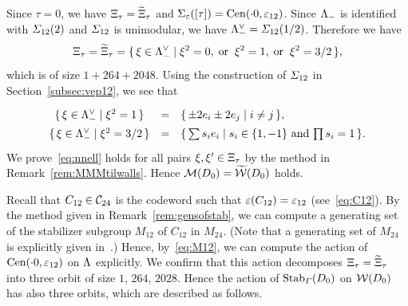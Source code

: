 \documentclass{amsart} %
\begin{document}
%
Since $\tau=0$,
we have $\Xi_{\tau}=\widetilde{\Xi}_{\tau}$ and $\Sigma_{\varepsilon}([\tau])=\mathrm{Cen}(\cdot 0, \varepsilon_{12})$.
Since $\Lambda_{-}$ is identified with $\varSigma_{12}(2)$ and $\varSigma_{12}$ is unimodular,
we have $\Lambda_{-}^{\vee}= \varSigma_{12}(1/2)$.
Therefore we have 
\[
\Xi_{\tau}=\widetilde{\Xi}_{\tau}=\{\,{\xi\in \Lambda_{-}^{\vee}}\mid {\xi^2=0, \;\textrm{or}\; \;  \xi^2=1,   \;\textrm{or}\; \; \xi^2=3/2} \,\},
\]
which is of size $1+264+2048$.
Using the construction of $\varSigma_{12}$ in Section~\ref{subsec:vep12},
we see that 
\[
\renewcommand{\arraystretch}{1.4}
\begin{array}{ccl}
\set{\xi\in \Leechminus\dual}{\xi^2=1} &=& \set{\pm 2 e_i\pm 2 e_j}{i\ne j}, \\
\set{\xi\in \Leechminus\dual}{\xi^2=3/2} &=& \set{\sum s_i e_i}{\textrm{$s_i\in \{1, -1\}$ and $\prod s_i=1$}}. \\
\end{array}
\]
%
%
We prove~\eqref{eq:nnell} holds  for all pairs  $\xi, \xi^{\prime}\in \Xi_{\tau}$
by the method in Remark~\ref{rem:MMMtilwalls}.
Hence 
$\mathord{\mathcal{M}}(D_0)=\widetilde{\mathord{\mathcal{W}}}(D_0)$ holds.
%
\par 
%
Recall that $C_{12}\in \mathord{\mathcal{C}}_{24}$ is the codeword such that $\varepsilon(C_{12})=\varepsilon_{12}$  (see~\eqref{eq:C12}).
By the method given in Remark~\ref{rem:gensofstab}, 
we can compute a  generating set of 
the stabilizer subgroup $M_{12}$ of $C_{12}$ in $M_{24}$.
(Note that a generating set of $M_{24}$ is explicitly given in~\cite[Chapter 10, Section 2]{theCSbook}.)
Hence, by~\eqref{eq:M12},
we can compute  the action of  $\mathrm{Cen}(\cdot 0, \varepsilon_{12})$ on $\Lambda$ explicitly.
We confirm that this action decomposes  $\Xi_{\tau}=\widetilde{\Xi}_{\tau}$
into three orbit of size $1$, $264$, $2028$.
Hence the action of $\operatorname{Stab}_{\varGamma}(D_0)$ on $\mathord{\mathcal{W}}(D_0)$ 
has also three orbits,
which are described as follows.
%
\end{document}
